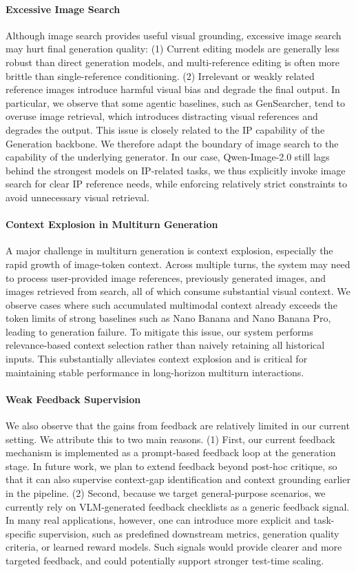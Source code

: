 \documentclass{llmxive}
\begin{document}
\paragraph{Excessive Image Search}
Although image search provides useful visual grounding, excessive image search may hurt final generation quality: (1) Current editing models are generally less robust than direct generation models, and multi-reference editing is often more brittle than single-reference conditioning. (2) Irrelevant or weakly related reference images introduce harmful visual bias and degrade the final output. In particular, we observe that some agentic baselines, such as GenSearcher, tend to overuse image retrieval, which introduces distracting visual references and degrades the output. This issue is closely related to the IP capability of the Generation backbone. We therefore adapt the boundary of image search to the capability of the underlying generator. In our case, Qwen-Image-2.0 still lags behind the strongest models on IP-related tasks, we thus explicitly invoke image search for clear IP reference needs, while enforcing relatively strict constraints to avoid unnecessary visual retrieval.

\paragraph{Context Explosion in Multiturn Generation}
A major challenge in multiturn generation is context explosion, especially the rapid growth of image-token context. Across multiple turns, the system may need to process user-provided image references, previously generated images, and images retrieved from search, all of which consume substantial visual context. We observe cases where such accumulated multimodal context already exceeds the token limits of strong baselines such as Nano Banana and Nano Banana Pro, leading to generation failure. To mitigate this issue, our system performs relevance-based context selection rather than naively retaining all historical inputs. This substantially alleviates context explosion and is critical for maintaining stable performance in long-horizon multiturn interactions.

\paragraph{Weak Feedback Supervision}
We also observe that the gains from feedback are relatively limited in our current setting. We attribute this to two main reasons. (1) First, our current feedback mechanism is implemented as a prompt-based feedback loop at the generation stage. In future work, we plan to extend feedback beyond post-hoc critique, so that it can also supervise context-gap identification and context grounding earlier in the pipeline. (2) Second, because we target general-purpose scenarios, we currently rely on VLM-generated feedback checklists as a generic feedback signal. In many real applications, however, one can introduce more explicit and task-specific supervision, such as predefined downstream metrics, generation quality criteria, or learned reward models. Such signals would provide clearer and more targeted feedback, and could potentially support stronger test-time scaling.
\end{document}
